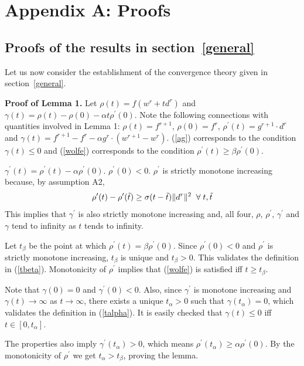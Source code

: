 \section{Appendix A: Proofs}
\label{proofs-general}

\subsection{Proofs of the results in section~\ref{general}}

Let us now consider the establishment of the convergence theory given in section~\ref{general}.

{\bf Proof of Lemma 1.}
Let $\rho(t)=f(w^r+td^r)$ and $\gamma(t)=\rho(t)-\rho(0)-\alpha t\rho^\prime(0)$.
Note the following connections with quantities involved in Lemma 1: $\rho(t)=f^{r+1}$, $\rho(0)=f^r$, $\rho^\prime(t)=g^{r+1}\cdot d^r$ and $\gamma(t)=f^{r+1} - f^r - \alpha g^r\cdot(w^{r+1}-w^r)$.
(\ref{ag}) corresponds to the condition $\gamma(t)\le 0$ and (\ref{wolfe}) corresponds to the condition $\rho^\prime(t)\ge \beta\rho^\prime(0)$.

$\gamma^\prime(t) = \rho^\prime(t)-\alpha \rho^\prime(0)$.
$\rho^\prime(0)<0$.
$\rho^\prime$ is strictly monotone increasing because, by assumption A2,
\begin{equation}
\rho^\prime(t)-\rho^\prime(\tilde{t}) \ge \sigma (t-\tilde{t})\|d^r\|^2 \;\; \forall \; t, \tilde{t}
\label{prop11}
\end{equation}
This implies that $\gamma^\prime$ is also strictly monotone increasing and, all four, $\rho$, $\rho^\prime$, $\gamma^\prime$ and $\gamma$ tend to infinity as $t$ tends to infinity.

Let $t_\beta$ be the point at which $\rho^\prime(t)=\beta\rho^\prime(0)$. Since $\rho^\prime(0)<0$ and $\rho^\prime$ is strictly monotone increasing, $t_\beta$ is unique and $t_\beta>0$. This validates the definition in (\ref{tbeta}). Monotonicity of $\rho^\prime$ implies that (\ref{wolfe}) is satisfied iff $t\ge t_\beta$.

Note that $\gamma(0)=0$ and $\gamma^\prime(0)<0$. Also, since $\gamma^\prime$ is monotone increasing and $\gamma(t)\to\infty$ as $t\to\infty$, there exists a unique $t_\alpha>0$ such that $\gamma(t_\alpha)=0$, which validates the definition in (\ref{talpha}). It is easily checked that $\gamma(t)\le 0$ iff $t\in [0,t_\alpha]$.

The properties also imply $\gamma^\prime(t_\alpha)> 0$, which means $\rho^\prime(t_\alpha) \ge \alpha\rho^\prime(0)$. By the monotonicity of $\rho^\prime$ we get $t_\alpha>t_\beta$, proving the lemma.


